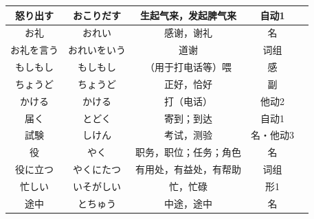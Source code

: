 \begin{longtable}{|c|c|c|c|c|}
怒り出す & おこりだす & 生起气来，发起脾气来 & 自动1 &  \\ \hline
お礼 & おれい & 感谢，谢礼 & 名 &  \\ \hline
お礼を言う & おれいをいう & 道谢 & 词组 &  \\ \hline
もしもし & もしもし & （用于打电话等）喂 & 感 &  \\ \hline
ちょうど & ちょうど & 正好，恰好 & 副 &  \\ \hline
かける & かける & 打（电话） & 他动2 &  \\ \hline
届く & とどく & 寄到；到达 & 自动1 &  \\ \hline
試験 & しけん & 考试，测验 & 名・他动3 &  \\ \hline
役 & やく & 职务，职位；任务；角色 & 名 &  \\ \hline
役に立つ & やくにたつ & 有用处，有益处，有帮助 & 词组 &  \\ \hline
忙しい & いそがしい & 忙，忙碌 & 形1 &  \\ \hline
途中 & とちゅう & 中途，途中 & 名 &  \\ \hline
\end{longtable}
